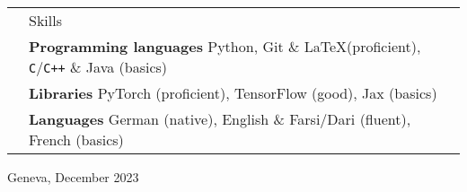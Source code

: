 \documentclass[11pt, a4paper]{article}
\newcommand{\headingfont}{\Large\color{OliveGreen}}
\newenvironment{SectionTable}[1]{
	\renewcommand*{\arraystretch}{1.7}
	\setlength{\tabcolsep}{10pt}
	\begin{longtable}{Rp{5.2in}} & #1 \\}
	{\end{longtable}\vspace{-.3cm}}
\begin{document}
    \begin{SectionTable}{\headingfont Skills}
		& \textbf{Programming languages} \newline
		Python, Git \& \LaTeX (proficient), \texttt{C}/\texttt{C++} \& Java (basics) \\
        
        & \textbf{Libraries} \newline
        PyTorch (proficient), TensorFlow (good), Jax (basics) \\
		
		& \textbf{Languages} \newline
		German (native), English \& Farsi/Dari (fluent), French (basics)
	\end{SectionTable}
		
	\vspace{0.6cm}
	Geneva, December 2023
	
\end{document}
